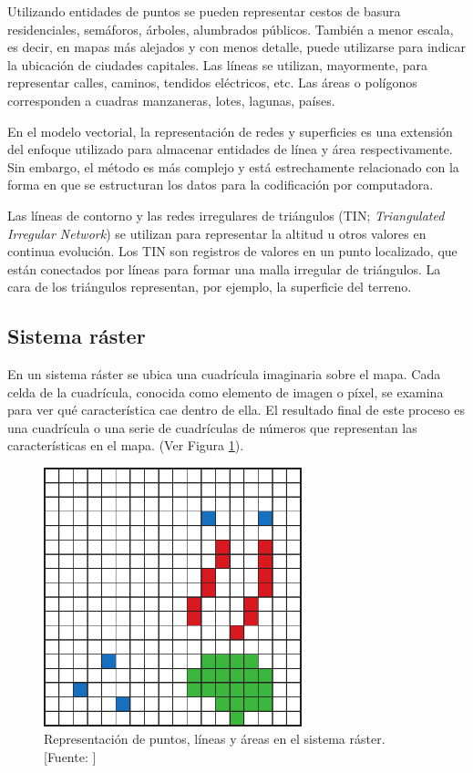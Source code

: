 Utilizando entidades de puntos se pueden representar cestos de basura residenciales, semáforos, árboles, alumbrados públicos. También a menor escala, es decir, en mapas más alejados y con menos detalle, puede utilizarse para indicar la ubicación de ciudades capitales. Las líneas se utilizan, mayormente, para representar calles, caminos, tendidos eléctricos, etc. Las áreas o polígonos corresponden a cuadras manzaneras, lotes, lagunas, países.

En el modelo vectorial, la representación de redes y superficies es una extensión del enfoque utilizado para almacenar entidades de línea y área respectivamente. Sin embargo, el método es más complejo y está estrechamente relacionado con la forma en que se estructuran los datos para la codificación por computadora.

Las líneas de contorno y las redes irregulares de triángulos (TIN; \textit{Triangulated Irregular Network}) se utilizan para representar la altitud u otros valores en continua evolución. Los TIN son registros de valores en un punto localizado, que están conectados por líneas para formar una malla irregular de triángulos. La cara de los triángulos representan, por ejemplo, la superficie del terreno.

\subsection{Sistema ráster}

En un sistema ráster se ubica una cuadrícula imaginaria sobre el mapa. Cada celda de la cuadrícula, conocida como elemento de imagen o píxel, se examina para ver qué característica cae dentro de ella. El resultado final de este proceso es una cuadrícula o una serie de cuadrículas de números que representan las características en el mapa. (Ver Figura \ref{fig:modeloRaster}).

\begin{figure}[H]
    \centering
    \includegraphics[width=7.5cm]{modeloRaster.png}
    \caption{Representación de puntos, líneas y áreas en el sistema ráster. [Fuente: \citet{Heywood2006AnSystems}]}
    \label{fig:modeloRaster}
\end{figure}

